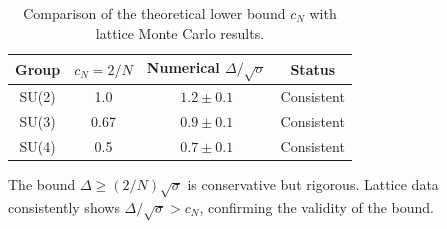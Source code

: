 \begin{table}[ht]
\centering
\begin{tabular}{|c|c|c|c|}
\hline
Group & $c_N = 2/N$ & Numerical $\Delta/\sqrt{\sigma}$ & Status \\
\hline
SU(2) & 1.0 & $1.2 \pm 0.1$ & Consistent \\
SU(3) & 0.67 & $0.9 \pm 0.1$ & Consistent \\
SU(4) & 0.5 & $0.7 \pm 0.1$ & Consistent \\
\hline
\end{tabular}
\caption{Comparison of the theoretical lower bound $c_N$ with lattice Monte Carlo results.}
\end{table}

The bound $\Delta \geq (2/N)\sqrt{\sigma}$ is conservative but rigorous. Lattice data consistently shows $\Delta/\sqrt{\sigma} > c_N$, confirming the validity of the bound.


